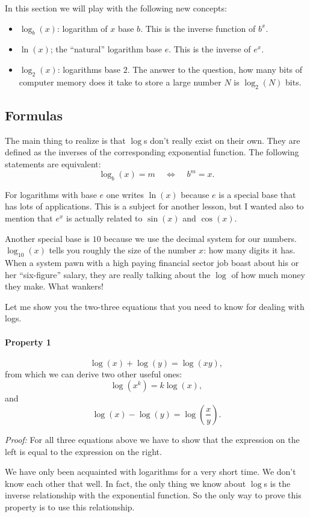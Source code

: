 \documentclass[twocolumn,8pt]{extarticle}
\newcommand{\dokutitleleveltree}[1]{\subsection{#1}}
\newcommand{\dokutitlelevelfive}[1]{\paragraph{#1}}
\newcommand{\dokuitalic}[1]{\textsl{#1}}
\newcommand{\dokuitem}{\item}
\begin{document}
In this section we will play with the following new concepts:


\begin{itemize}\dokuitem  \(\log_b(x)\): logarithm of \(x\) base \(b\). This is the inverse function of \(b^x\).
\dokuitem  \(\ln(x)\); the ``natural'' logarithm base \(e\). This is the inverse of \(e^x\).
\dokuitem  \(\log_2(x)\): logarithms base \(2\). The answer to the question, how many bits of computer memory does it take to store a large number \(N\)  is \(\log_2(N)\) bits.
\end{itemize}

\dokutitleleveltree{Formulas}
\label{51d24e1edefe34e683025dbba5c6eed6}%

The main thing to realize is that \(\log\)s don't really exist on their own.
They are defined as the inverses of the corresponding exponential function.
The following statements are equivalent:
\[
  \log_b(x)=m \ \ \ \ \  \Leftrightarrow \ \ \ \ \ b^m=x.
\]

For logarithms with base \(e\) one writes \(\ln(x)\) because
\(e\) is a special base that has lots of applications.
This is a subject for another lesson, but I wanted also
to mention that \(e^x\) is actually related to \(\sin(x)\) and \(\cos(x)\).

Another special base is \(10\) because we use the decimal
system for our numbers. \(\log_{10}(x)\) tells you roughly
the size of the number \(x\): how many digits it has. 
When a system pawn with a high paying financial sector job
boast about his or her ``six-figure'' salary, they are really talking
about the \(\log\) of how much money they make.
What wankers! 

Let me show you the two-three equations that you need to know
for dealing with logs.


\dokutitlelevelfive{Property 1}

\[
  \log(x)+\log(y)=\log(xy),
\]
from which we can derive two other useful ones:
\[
  \log(x^k)=k\log(x),
\]
and 
\[ 
  \log(x)-\log(y)=\log\left(\frac{x}{y}\right).
\]

\dokuitalic{Proof:} For all three equations above we have to show
that the expression on the left is equal to the expression
on the right.

We have only been acquainted with logarithms for a very
short time. We don't know each other that well. 
In fact, the only thing we know about \(\log\)s is the 
inverse relationship with the exponential function.
So the only way to prove this property is to use this relationship.
\end{document}
